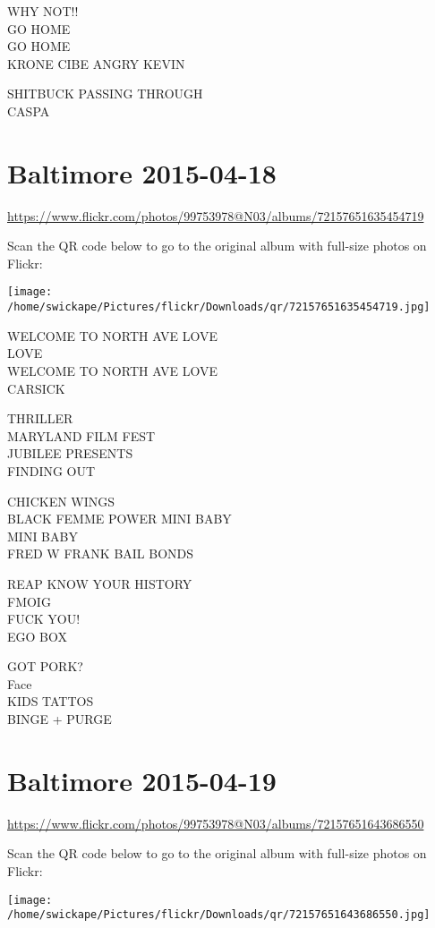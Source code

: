 \documentclass[10pt,letterpaper]{article}
\begin{document}
WHY NOT!!\\
GO HOME\\
GO HOME\\
KRONE CIBE ANGRY KEVIN

SHITBUCK PASSING THROUGH\\
CASPA


\section*{Baltimore 2015-04-18}

\url{https://www.flickr.com/photos/99753978@N03/albums/72157651635454719}

Scan the QR code below to go to the original album with full-size photos on Flickr:

\texttt{[image: /home/swickape/Pictures/flickr/Downloads/qr/72157651635454719.jpg]}


WELCOME TO NORTH AVE LOVE\\
LOVE\\
WELCOME TO NORTH AVE LOVE\\
CARSICK

THRILLER\\
MARYLAND FILM FEST\\
JUBILEE PRESENTS\\
FINDING OUT

CHICKEN WINGS\\
BLACK FEMME POWER MINI BABY\\
MINI BABY\\
FRED W FRANK BAIL BONDS

REAP KNOW YOUR HISTORY\\
FMOIG\\
FUCK YOU!\\
EGO BOX

GOT PORK?\\
Face\\
KIDS TATTOS\\
BINGE + PURGE


\section*{Baltimore 2015-04-19}

\url{https://www.flickr.com/photos/99753978@N03/albums/72157651643686550}

Scan the QR code below to go to the original album with full-size photos on Flickr:

\texttt{[image: /home/swickape/Pictures/flickr/Downloads/qr/72157651643686550.jpg]}
\end{document}
